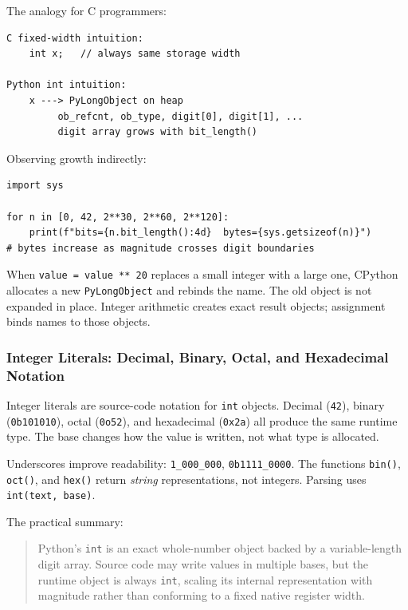 The analogy for C programmers:

\begin{verbatim}
C fixed-width intuition:
    int x;   // always same storage width

Python int intuition:
    x ---> PyLongObject on heap
         ob_refcnt, ob_type, digit[0], digit[1], ...
         digit array grows with bit_length()
\end{verbatim}

Observing growth indirectly:

\begin{verbatim}
import sys

for n in [0, 42, 2**30, 2**60, 2**120]:
    print(f"bits={n.bit_length():4d}  bytes={sys.getsizeof(n)}")
# bytes increase as magnitude crosses digit boundaries
\end{verbatim}

When \texttt{value = value ** 20} replaces a small integer with a large one, CPython allocates a new \texttt{PyLongObject} and rebinds the name. The old object is not expanded in place. Integer arithmetic creates exact result objects; assignment binds names to those objects.

\subsubsection{Integer Literals: Decimal, Binary, Octal, and Hexadecimal Notation}

Integer literals are source-code notation for \texttt{int} objects. Decimal (\texttt{42}), binary (\texttt{0b101010}), octal (\texttt{0o52}), and hexadecimal (\texttt{0x2a}) all produce the same runtime type. The base changes how the value is written, not what type is allocated.

Underscores improve readability: \texttt{1\_000\_000}, \texttt{0b1111\_0000}. The functions \texttt{bin()}, \texttt{oct()}, and \texttt{hex()} return \emph{string} representations, not integers. Parsing uses \texttt{int(text, base)}.

The practical summary:

\begin{quote}
Python's \texttt{int} is an exact whole-number object backed by a variable-length digit array. Source code may write values in multiple bases, but the runtime object is always \texttt{int}, scaling its internal representation with magnitude rather than conforming to a fixed native register width.
\end{quote}

